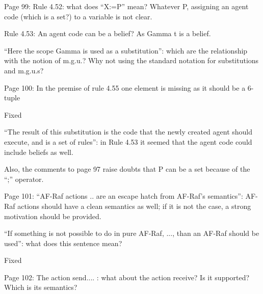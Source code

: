 \documentclass{article}
\newcommand{\todo}[1]{[\textcolor{red}{TODO}: #1]}
\newenvironment{them}{\noindent\begingroup\color{blue}}{\endgroup\par}
\begin{document}
\begin{them}

Page 99:
Rule 4.52: what does “X:=P” mean? Whatever P, assigning an agent code (which is a set?) to a
variable is not clear.
\end{them}
\todo{}

\begin{them}

Rule 4.53:
An agent code can be a belief? As Gamma t is a belief.
\end{them}
\todo{}

\begin{them}

“Here the scope Gamma is used as a substitution”: which are the relationship with the notion of
m.g.u.? Why not using the standard notation for substitutions and m.g.u.s?
\end{them}
\todo{}

\begin{them}

Page 100:
In the premise of rule 4.55 one element is missing as it should be a 6-tuple
\end{them}
Fixed

\begin{them}

“The result of this substitution is the code that the newly created agent should execute, and is a set
of rules”: in Rule 4.53 it seemed that the agent code could include beliefs as well.
\end{them}
\todo{}

\begin{them}

 Also, the
comments to page 97 raise doubts that P can be a set because of the “;” operator.
\end{them}
\todo{}

\begin{them}

Page 101:
“AF-Raf actions .. are an escape hatch from AF-Raf's semantics”: AF-Raf actions should have a clean
semantics as well; if it is not the case, a strong motivation should be provided.
\end{them}
\todo{}

\begin{them}

“If something is not possible to do in pure AF-Raf, ..., than an AF-Raf should be used”: what does this
sentence mean?
\end{them}
Fixed

\begin{them}

Page 102:
The action send.... : what about the action receive? Is it supported? Which is its semantics?
\end{them}
\todo{}
\end{document}
